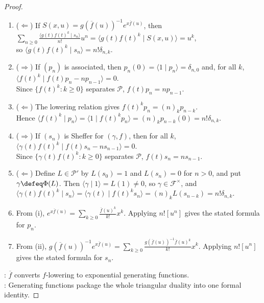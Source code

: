 \begin{theorem}
\begin{proof}
\begin{enumerate}[label=(\roman*).]
\item[$(ii)$]($\Leftarrow$) If $S(x,u)=g(\overline f(u))^{-1}e^{x\overline f(u)}$, then $\sum\limits_{n\geq0}\frac{\langle g(t)f(t)^k\mid s_n\rangle}{n!}u^n =\langle g(t)f(t)^k\mid S(x,u)\rangle=u^k$,\\
so $\langle g(t)f(t)^k\mid s_n\rangle=n!\delta_{n,k}$.
\item[$(iii)$]($\Rightarrow$) If $(p_n)$ is associated, then $p_n(0)=\langle 1\mid p_n\rangle=\delta_{n,0}$ and, for all $k$, $\langle f(t)^k\mid f(t)p_n-np_{n-1}\rangle=0$.\\
Since $\{f(t)^k:k\geq0\}$ separates $\mathscr{P}$, $f(t)p_n=np_{n-1}$.
\item[$(iii)$]($\Leftarrow$) The lowering relation gives $f(t)^kp_n=(n)_kp_{n-k}$.\\
Hence $\langle f(t)^k\mid p_n\rangle =\langle 1\mid f(t)^kp_n\rangle =(n)_kp_{n-k}(0)=n!\delta_{n,k}$.
\item[$(iv)$]($\Rightarrow$) If $(s_n)$ is Sheffer for $(\gamma,f)$, then for all $k$, $\langle \gamma(t)f(t)^k\mid f(t)s_n-ns_{n-1}\rangle=0$.\\
Since $\{\gamma(t)f(t)^k:k\geq0\}$ separates $\mathscr{P}$, $f(t)s_n=ns_{n-1}$.
\item[$(iv)$]($\Leftarrow$) Define $L\in\mathscr{P}'$ by $L(s_0)=1$ and $L(s_n)=0$ for $n>0$, and put $\gamma\defeq\Phi(L)$. Then $\langle\gamma\mid1\rangle=L(1)\neq0$, so $\gamma\in\mathscr{F}^{\times}$, and $\langle \gamma(t)f(t)^k\mid s_n\rangle=\langle \gamma(t)\mid f(t)^ks_n\rangle=(n)_kL(s_{n-k})=n!\delta_{n,k}$.
\item[$(v)$] From (i), $e^{x\overline f(u)} =\sum\limits_{k\geq0}\frac{\overline f(u)^k}{k!}x^k$. Applying $n![u^n]$ gives the stated formula for $p_n$.
\item[$(vi)$] From (ii), $g(\overline f(u))^{-1}e^{x\overline f(u)} =\sum\limits_{k\geq0} \frac{g(\overline f(u))^{-1}\overline f(u)^k}{k!}x^k$. Applying $n![u^n]$ gives the stated formula for $s_n$.
\end{enumerate}
: $\overline f$ converts $f$-lowering to exponential generating functions.\\
: Generating functions package the whole triangular duality into one formal identity.
\end{proof}
\end{theorem}

